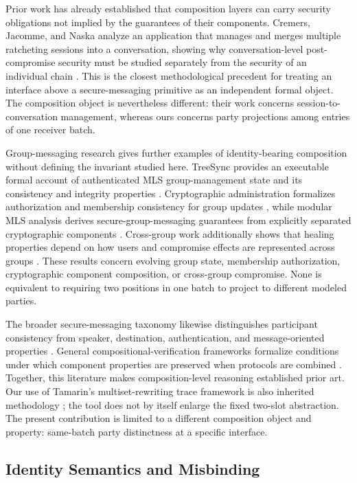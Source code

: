 Prior work has already established that composition layers can carry security
obligations not implied by the guarantees of their components. Cremers,
Jacomme, and Naska analyze an application that manages and merges multiple
ratcheting sessions into a conversation, showing why conversation-level
post-compromise security must be studied separately from the security of an
individual chain \cite{cremers2023session}. This is the closest methodological
precedent for treating an interface above a secure-messaging primitive as an
independent formal object. The composition object is nevertheless different:
their work concerns session-to-conversation management, whereas ours concerns
party projections among entries of one receiver batch.

Group-messaging research gives further examples of identity-bearing
composition without defining the invariant studied here. TreeSync provides an
executable formal account of authenticated MLS group-management state and its
consistency and integrity properties \cite{wallez2023treesync}. Cryptographic
administration formalizes authorization and membership consistency for group
updates \cite{balbas2023administration}, while modular MLS analysis derives
secure-group-messaging guarantees from explicitly separated cryptographic
components \cite{alwen2021modular}. Cross-group work additionally shows that
healing properties depend on how users and compromise effects are represented
across groups \cite{cremers2021healing}. These results concern evolving group
state, membership authorization, cryptographic component composition, or
cross-group compromise. None is equivalent to requiring two positions in one
\batchreceive batch to project to different modeled parties.

The broader secure-messaging taxonomy likewise distinguishes participant
consistency from speaker, destination, authentication, and message-oriented
properties \cite{unger2015sok}. General compositional-verification frameworks
formalize conditions under which component properties are preserved when
protocols are combined \cite{andova2008compositional}. Together, this
literature makes composition-level reasoning established prior art. Our use of
Tamarin's multiset-rewriting trace framework is also inherited methodology
\cite{meier2013tamarin}; the tool does not by itself enlarge the fixed
two-slot abstraction. The present contribution is limited to a different
composition object and property: same-batch party distinctness at a specific
\kwaay interface.

\subsection{Identity Semantics and Misbinding}

